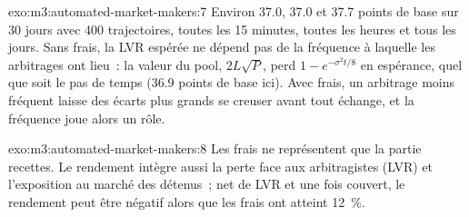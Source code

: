 \begin{solution}{exo:m3:automated-market-makers:7}
Environ 37.0, 37.0 et 37.7 points de base sur 30 jours avec 400 trajectoires, toutes les 15 minutes, toutes les heures et tous les jours. Sans frais, la LVR espérée
ne dépend pas de la fréquence à laquelle les arbitrages ont lieu~: la valeur du pool, $2L\sqrt{P}$, perd $1 - e^{-\sigma^2t/8}$ en espérance, quel que soit
le pas de temps (36.9 points de base ici). Avec frais, un arbitrage moins fréquent laisse des écarts plus grands se creuser avant tout échange, et la fréquence
joue alors un rôle.
\end{solution}

\begin{solution}{exo:m3:automated-market-makers:8}
Les frais ne représentent que la partie recettes. Le rendement intègre aussi la perte face aux arbitragistes (LVR) et l'exposition au marché des  détenus~;
net de LVR et une fois couvert, le rendement peut être négatif alors que les frais ont atteint 12~\%.
\end{solution}


